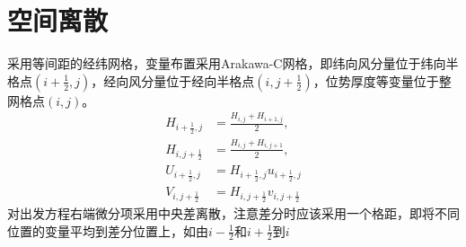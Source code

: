 \documentclass{ctexart}
\begin{document}
\section{空间离散}
采用等间距的经纬网格，变量布置采用Arakawa-C网格，即纬向风分量位于纬向半格点$\left( i + \frac{1}{2}, j \right)$，经向风分量位于经向半格点$\left( i, j + \frac{1}{2} \right)$，位势厚度等变量位于整网格点$\left( i, j \right)$。
\begin{align}
  H_{i+\frac{1}{2},j} & = \frac{H_{i,j} + H_{i+1,j}}{2}, \nonumber \\
  H_{i,j+\frac{1}{2}} & = \frac{H_{i,j} + H_{i,j+1}}{2}, \nonumber \\
  U_{i+\frac{1}{2},j} & = H_{i+\frac{1}{2},j} u_{i+\frac{1}{2},j} \nonumber \\
  V_{i,j+\frac{1}{2}} & = H_{i,j+\frac{1}{2}} v_{i,j+\frac{1}{2}} \nonumber
\end{align}
对出发方程右端微分项采用中央差离散，注意差分时应该采用一个格距，即将不同位置的变量平均到差分位置上，如由$i-\frac{1}{2}$和$i+\frac{1}{2}$到$i$
\end{document}
